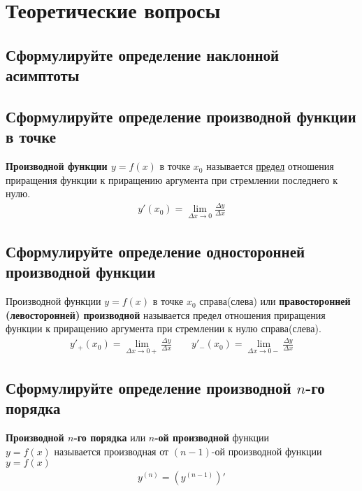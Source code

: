 


\tableofcontents
\newpage
\section{Теоретические вопросы}
\subsection{Сформулируйте определение наклонной асимптоты}
\begin{definition}

\end{definition}
\subsection{Сформулируйте определение производной функции в точке}
\begin{definition}
	\textbf{Производной функции $y = f(x)$} в точке $x_0$ называется \underline{предел} отношения приращения функции к приращению аргумента при стремлении последнего к нулю.
	\begin{align*}
		\boxed{y'(x_0) = \lim\limits_{\Delta x \to 0} \frac{\Delta y}{\Delta x}}
	\end{align*}
\end{definition}

\subsection{Сформулируйте определение односторонней производной функции}
\begin{definition}
	Производной функции $y=f(x)$ в точке $x_0$ справа(слева) или \textbf{правосторонней (левосторонней) производной} называется предел отношения приращения функции к приращению аргумента при стремлении к нулю справа(слева).
	\begin{gather*}
		\boxed{y'_+(x_0) = \lim\limits_{\Delta x \to 0+} \frac{\Delta y}{\Delta x}} \qquad \boxed{y'_-(x_0) = \lim\limits_{\Delta x \to 0-} \frac{\Delta y}{\Delta x}}
	\end{gather*}
\end{definition}

\subsection{Сформулируйте определение производной $n$-го порядка}
\begin{definition}
	\textbf{Производной $n$-го порядка} или \textbf{$n$-ой производной} функции \\ $y=f(x)$ называется производная от $(n-1)$-ой производной функции $y=f(x)$
	\begin{align*}
		\boxed{y^{(n)} = \left( y^{(n-1)} \right)'}
	\end{align*}
\end{definition}


